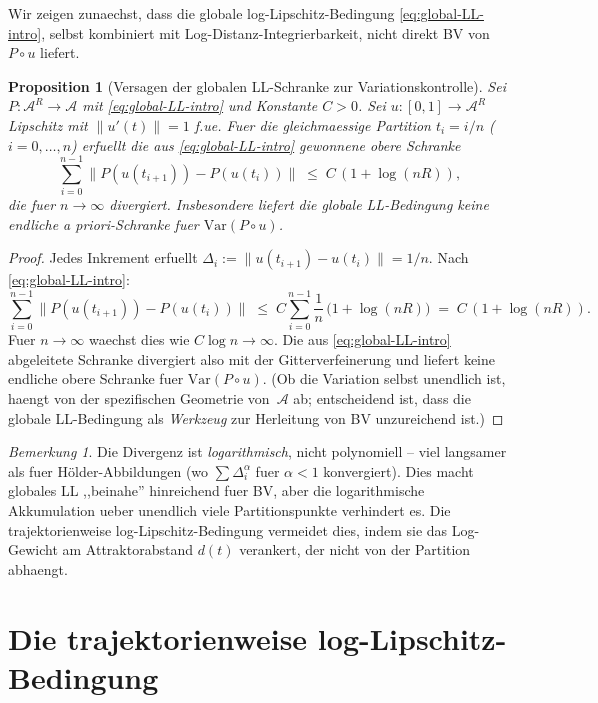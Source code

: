 \documentclass[12pt,a4paper]{article}
\theoremstyle{definition}
\theoremstyle{plain}
\newtheorem{proposition}[definition]{Proposition}
\theoremstyle{remark}
\newtheorem{remark}[definition]{Bemerkung}
\newcommand{\Var}{\mathrm{Var}}
\begin{document}
Wir zeigen zunaechst, dass die globale log-Lipschitz-Bedingung
\eqref{eq:global-LL-intro}, selbst kombiniert mit
Log-Distanz-Integrierbarkeit, nicht direkt BV von $P \circ u$ liefert.

\begin{proposition}[Versagen der globalen LL-Schranke zur Variationskontrolle]
\label{prop:divergence}
Sei $P: \mathcal{A}^R \to \mathcal{A}$ mit
\eqref{eq:global-LL-intro} und Konstante $C > 0$.  Sei
$u: [0,1] \to \mathcal{A}^R$ Lipschitz mit
$\|u'(t)\| = 1$ f.ue.  Fuer die gleichmaessige Partition
$t_i = i/n$ ($i = 0, \ldots, n$) erfuellt die aus
\eqref{eq:global-LL-intro} gewonnene obere Schranke
\[
  \sum_{i=0}^{n-1} \|P(u(t_{i+1})) - P(u(t_i))\|
  \;\le\;
  C\,(1 + \log(nR)),
\]
die fuer $n \to \infty$ divergiert.  Insbesondere liefert die
globale LL-Bedingung keine endliche \emph{a priori}-Schranke
fuer $\Var(P \circ u)$.
\end{proposition}

\begin{proof}
Jedes Inkrement erfuellt $\Delta_i := \|u(t_{i+1}) - u(t_i)\| = 1/n$.
Nach \eqref{eq:global-LL-intro}:
\[
  \sum_{i=0}^{n-1} \|P(u(t_{i+1})) - P(u(t_i))\|
  \;\le\;
  C \sum_{i=0}^{n-1} \frac{1}{n}\,
  \bigl(1 + \log(nR)\bigr)
  \;=\;
  C\,(1 + \log(nR)).
\]
Fuer $n \to \infty$ waechst dies wie $C\log n \to \infty$.
Die aus \eqref{eq:global-LL-intro} abgeleitete Schranke divergiert
also mit der Gitterverfeinerung und liefert keine endliche obere
Schranke fuer $\Var(P \circ u)$.  (Ob die Variation selbst unendlich
ist, haengt von der spezifischen Geometrie von~$\mathcal{A}$ ab;
entscheidend ist, dass die globale LL-Bedingung als \emph{Werkzeug}
zur Herleitung von BV unzureichend ist.)
\end{proof}

\begin{remark}
Die Divergenz ist \emph{logarithmisch}, nicht polynomiell -- viel
langsamer als fuer H\"older-Abbildungen (wo $\sum \Delta_i^\alpha$
fuer $\alpha < 1$ konvergiert).  Dies macht globales LL ,,beinahe''
hinreichend fuer BV, aber die logarithmische Akkumulation ueber
unendlich viele Partitionspunkte verhindert es.  Die trajektorienweise
log-Lipschitz-Bedingung vermeidet dies, indem sie das Log-Gewicht am
Attraktorabstand $d(t)$ verankert, der nicht von der Partition
abhaengt.
\end{remark}


\section{Die trajektorienweise log-Lipschitz-Bedingung}
\label{sec:TLL}
\end{document}
